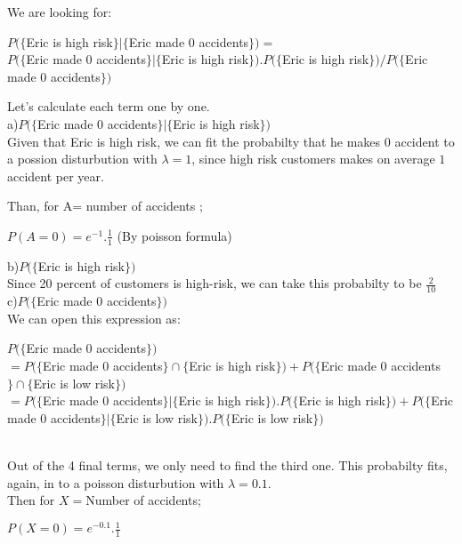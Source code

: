\documentclass[12pt]{article}
\begin{document}
We are looking for:
\begin{center}
$P( \{$Eric is high risk$\} | \{$Eric made 0 accidents$\})=$\\
$P( \{$Eric made 0 accidents$\} | \{$Eric is high risk$\}).P(\{$Eric is high risk$\}) / P(\{$Eric made 0 accidents$\})   $\\
\end{center}

Let's calculate each term one by one.\\

a)$P( \{$Eric made 0 accidents$\} | \{$Eric is high risk$\})$\\

Given that Eric is high risk, we can fit the probabilty that he makes 0 accident to a possion disturbution with $\lambda=1$, since high risk customers makes on average $1$ accident per year.

Than, for A={ number of accidents };
\begin{center}
$P(A=0)=e^{-1}.\frac{1}{1}$ (By poisson formula)\\
\end{center}


b)$P(\{$Eric is high risk$\}) $\\

Since 20 percent of customers is high-risk, we can take this probabilty to be $\frac{2}{10}$\\


c)$P(\{$Eric made 0 accidents$\})$\\

We can open this expression as:\\

\begin{frame}

$ P(\{$Eric made 0 accidents$\}) $\\
$=  P(   \{$Eric made 0 accidents$\}  \cap \{$Eric is high risk$\}     )   +   P(\{   $Eric made 0 accidents$\} \cap \{$Eric is low risk$\}     )$\\
$=  P(   \{$Eric made 0 accidents$\}  | \{$Eric is high risk$\}     ) .P(\{$Eric is high risk$\})   +   P(\{   $Eric made 0 accidents$\} |\{$Eric is low risk$\}     ) . P(\{$Eric is low risk$\})   $\\\\
\end{frame}

Out of the 4 final terms, we only need to find the third one. This probabilty fits, again, in to a poisson disturbution with $\lambda=0.1$. \\
Then for $X=${Number of accidents};
\begin{center}
$P(X=0)=e^{-0.1}.\frac{1}{1}$\\
\end{center}
\end{document}

